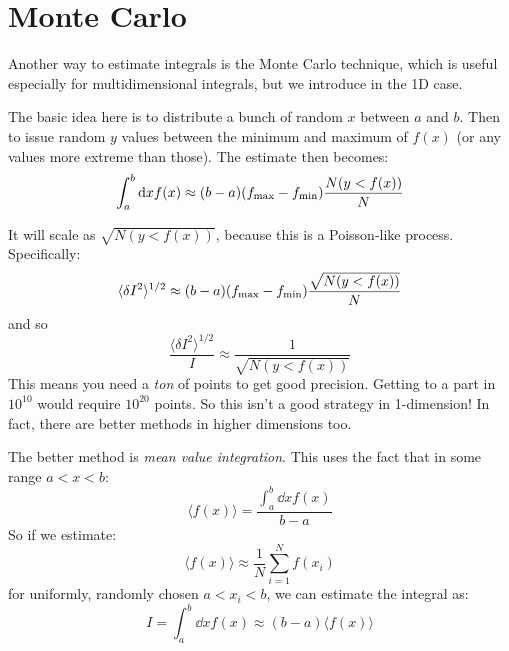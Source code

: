\section{Monte Carlo}

Another way to estimate integrals is the Monte Carlo technique, which
is useful especially for multidimensional integrals, but we introduce
in the 1D case.

The basic idea here is to distribute a bunch of random $x$ between $a$
and $b$. Then to issue random $y$ values between the minimum and
maximum of $f(x)$ (or any values more extreme than those). The
estimate then becomes:
\begin{equation}
\int_a^b {\rm d}x f(x) \approx (b-a) (f_{\rm max} - f_{\rm min})
\frac{N(y<f(x))}{N}
\end{equation}


\begin{answer}
It will scale as $\sqrt{N(y<f(x))}$, because this is a Poisson-like
process.  Specifically:
\begin{equation}
\langle\delta I^2 \rangle^{1/2} \approx (b-a) (f_{\rm max} - f_{\rm min})
\frac{\sqrt{N(y<f(x))}}{N}
\end{equation}
and so
\begin{equation}
\frac{\langle\delta I^2 \rangle^{1/2}}{I} \approx 
\frac{1}{\sqrt{N(y<f(x))}}
\end{equation}
This means you need a {\it ton} of points to get good
precision. Getting to a part in $10^{10}$ would require $10^{20}$
points. So this isn't a good strategy in 1-dimension! In fact, there
are better methods in higher dimensions too.
\end{answer}

The better method is {\it mean value integration}. This uses the fact
that in some range $a<x<b$:
\begin{equation}
\langle f(x) \rangle = \frac{\int_a^b \dd{x}  f(x)}{b-a}
\end{equation}
So if we estimate:
\begin{equation}
\langle f(x) \rangle \approx \frac{1}{N}\sum_{i=1}^N f(x_i)
\end{equation}
for uniformly, randomly chosen $a<x_i<b$, we can estimate the integral
as:
\begin{equation}
I = \int_a^b \dd{x}  f(x) \approx (b-a) \langle f(x)\rangle
\end{equation}


